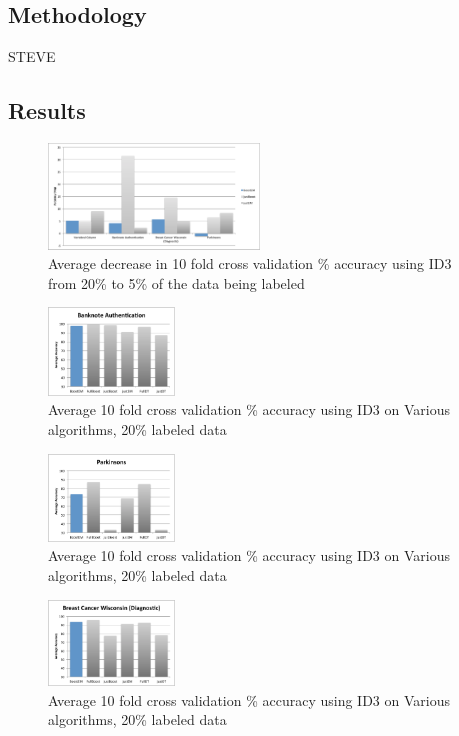 \documentclass{sig-alternate}
\begin{document}
\subsection{Methodology}
STEVE
\subsection{Results}


 \begin{figure}
\centering
\includegraphics[width=0.5\textwidth]{figures/accDrops.pdf}
\caption{Average decrease in 10 fold cross validation \% accuracy using ID3 from 20\% to 5\% of the data being labeled}
\label{accDrop}
\end{figure}
 
\begin{figure}
\centering
\includegraphics[width=0.3\textwidth]{figures/bankAcc.pdf}
\caption{Average 10 fold cross validation \% accuracy using ID3 on Various algorithms, 20\% labeled data}
\label{bankAcc}
\end{figure}
\begin{figure}
\centering
\includegraphics[width=0.3\textwidth]{figures/parkAcc.pdf}
\caption{Average 10 fold cross validation \% accuracy using ID3 on Various algorithms, 20\% labeled data}
\label{parkAcc}
\end{figure}

\begin{figure}
\centering
\includegraphics[width=0.3\textwidth]{figures/breaAcc.pdf}
\caption{Average 10 fold cross validation \% accuracy using ID3 on Various algorithms, 20\% labeled data}
\label{breaAcc}
\end{figure}
\end{document}
